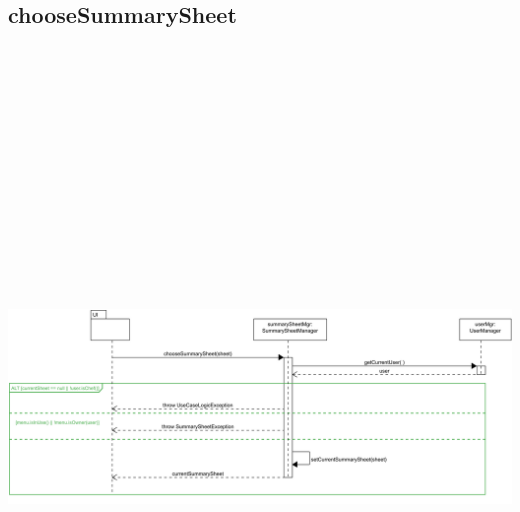 \subsection{chooseSummarySheet}
\centering\includegraphics[max width=\textwidth, max height=190mm]{../resources/img/GCC/DSD/op1a.png}

